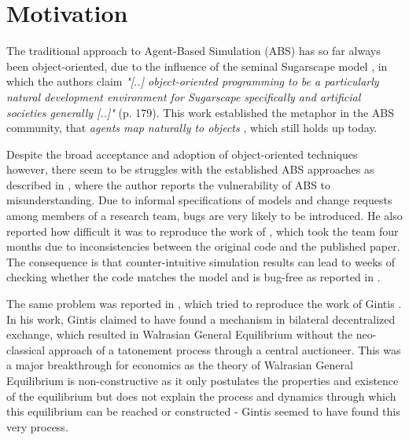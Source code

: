 \chapter{Motivation}
\label{ch:motivation}
The traditional approach to Agent-Based Simulation (ABS) has so far always been object-oriented, due to the influence of the seminal Sugarscape model \cite{epstein_growing_1996}, in which the authors claim \textit{"[..] object-oriented programming to be a particularly natural development environment for Sugarscape specifically and artificial societies generally [..]"} (p. 179). This work established the metaphor in the ABS community, that \textit{agents map naturally to objects} \cite{north_managing_2007}, which still holds up today.

Despite the broad acceptance and adoption of object-oriented techniques however, there seem to be struggles with the established ABS approaches as described in \cite{axelrod_chapter_2006}, where the author reports the vulnerability of ABS to misunderstanding. Due to informal specifications of models and change requests among members of a research team, bugs are very likely to be introduced. He also reported how difficult it was to reproduce the work of \cite{axelrod_convergence_1995}, which took the team four months due to inconsistencies between the original code and the published paper. The consequence is that counter-intuitive simulation results can lead to weeks of checking whether the code matches the model and is bug-free as reported in \cite{axelrod_advancing_1997}.

The same problem was reported in \cite{ionescu_dependently-typed_2012}, which tried to reproduce the work of Gintis \cite{gintis_emergence_2006}. In his work, Gintis claimed to have found a mechanism in bilateral decentralized exchange, which resulted in Walrasian General Equilibrium without the neo-classical approach of a tatonement process through a central auctioneer. This was a major breakthrough for economics as the theory of Walrasian General Equilibrium is non-constructive as it only postulates the properties and existence of the equilibrium \cite{colell_microeconomic_1995} but does not explain the process and dynamics through which this equilibrium can be reached or constructed - Gintis seemed to have found this very process.

